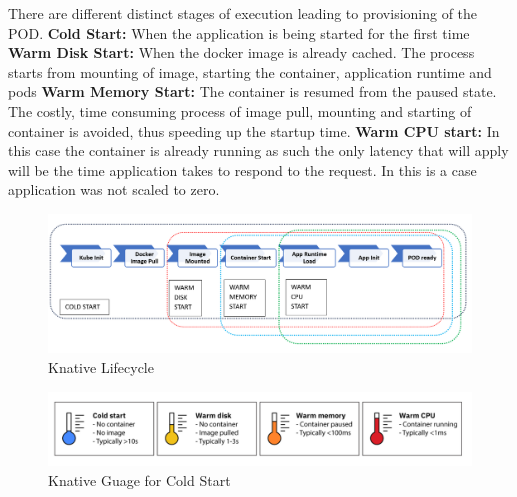 \documentclass{article}
\begin{document}
\begin{flushleft}
There are different distinct stages of execution leading to provisioning of the \gls{POD}. 
\newline
\textbf{Cold Start:} When the application is being started for the first time
\newline
\textbf{Warm Disk Start:} When the docker image is already cached. The process starts from mounting of image, starting the container, application runtime and pods
\newline
\textbf{Warm Memory Start:} The container is resumed from the paused state. The costly, time consuming process of image pull, mounting and starting of container is avoided, thus speeding up the startup time.
\newline
\textbf{Warm CPU start:} In this case the container is already running as such the only latency that will apply will be the time application takes to respond to the request. In this is a case application was not scaled to zero.
\pagebreak
\begin{figure}[h]
    \centering
    \includegraphics[width=1.0\linewidth]{images/Knative_lifecycle.PNG}
    \caption{Knative Lifecycle}
    \label{fig:enter-label}
\end{figure}
\par
\begin{figure}[h]
    \centering
    \includegraphics[width=1.0\linewidth]{images/ColdStart-Knative-Image.PNG}
    \caption{Knative Guage for Cold Start}
    \label{fig:enter-label}
\end{figure}
\par
{}
\end{flushleft}
\pagebreak
\end{document}
